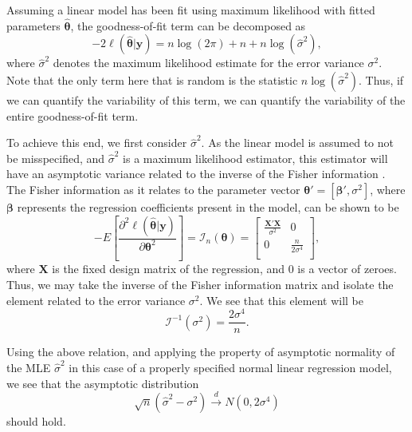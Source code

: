 \documentclass[sn-mathphys-ay]{sn-jnl}
\begin{document}
		Assuming a linear model has been fit using maximum likelihood with fitted parameters $\hat{\bm{\theta}}$, the goodness-of-fit term can be decomposed as
		\begin{equation}
			-2 \ell (\hat{\bm{\theta}} | \bm{y} ) = n \log(2 \pi) + n + n \log(\hat{\sigma}^2 ) ,
		\end{equation}
		where $\hat{\sigma}^2$ denotes the maximum likelihood estimate for the error variance $\sigma^2$. Note that the only term here that is random is
		the statistic $n \log(\hat{\sigma}^2)$. Thus, if we can quantify the variability of this term, we can quantify the variability of the entire goodness-of-fit
		term.

		To achieve this end, we first consider $\hat{\sigma}^2$. As the linear model is assumed to not be misspecified, and $\hat{\sigma}^2$ is a maximum likelihood
		estimator, this estimator will have an asymptotic variance related to the inverse of the Fisher information \citep{Fisher}. The Fisher information as it relates
		to the parameter vector $\bm{\theta}' = [\bm{\beta}', \sigma^2]$, where $\bm{\beta}$ represents the regression coefficients
		present in the model, can be shown to be
		\begin{equation*}
			- E \left[ \frac{\partial^2 \ell (\hat{\bm{\theta}} | \bm{y} )}{\partial \bm{\theta}^2} \right] = \bm{\mathcal{I}}_{n}(\bm{\theta}) =
			\begin{bmatrix}
				\frac{\bm{X}' \bm{X}}{\sigma^2} & 0 \\
				0 & \frac{n}{2 \sigma^4} \\
			\end{bmatrix}
			,
		\end{equation*}
		where $\bm{X}$ is the fixed design matrix of the regression, and $0$ is a vector of zeroes. Thus, we may take the inverse of the Fisher information matrix and isolate
		the element related to the error variance $\sigma^2$. We see that this element will be
		\begin{equation*}
			\bm{\mathcal{I}}^{-1}(\sigma ^2) = \frac{2 \sigma ^4}{n} .
		\end{equation*}
		
		Using the above relation, and applying the property of asymptotic normality of the MLE $\hat{\sigma}^2$ in this case of a properly specified normal linear
		regression model, we see that the asymptotic distribution
		\begin{equation*}
			\sqrt{n} (\hat{\sigma}^2 - \sigma^2) \xrightarrow[]{d} N(0, 2 \sigma ^4 )
		\end{equation*}
		should hold.
\end{document}
